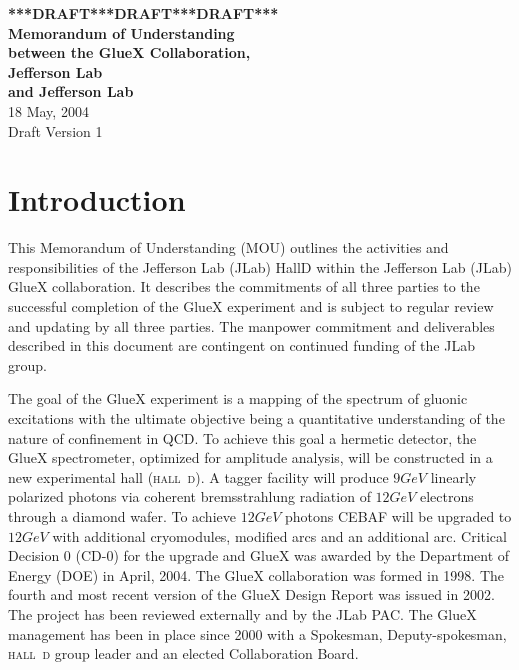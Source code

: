 \documentclass[oneside,12pt,letterpaper]{article}
\newcommand{\hd}{\mbox{\textsc{hall d}}}
\newcommand{\gx}{\mbox{GlueX}}
\newcommand{\instname}{Jefferson Lab}
\newcommand{\groupname}{HallD}
\newcommand{\instabbr}{JLab}
\begin{document}

\begin{center}

\textbf{\large{***DRAFT***DRAFT***DRAFT***\\
Memorandum of Understanding \\ between the 
\gx{} Collaboration, \\ Jefferson Lab \\ and \instname}} \\
18 May, 2004 \\
Draft Version 1
\end{center}

\vspace{1cm}



\section{\label{sec:introduction}Introduction}
This Memorandum of Understanding (MOU) outlines the activities and
responsibilities of the \instname{} (\instabbr ) \groupname{} within
the Jefferson Lab (JLab) \gx{} collaboration.  It describes
the commitments of all three parties to the successful completion
of the \gx{} experiment and is subject to regular review and updating
by all three parties. The manpower commitment and deliverables 
described in this document are contingent on continued funding of 
the \instabbr{} group.


The goal of the \gx{} experiment is a mapping of the spectrum of gluonic
excitations with the ultimate objective being a quantitative understanding of
the nature of confinement in QCD.  To achieve this goal a hermetic detector,
the \gx{} spectrometer, optimized for amplitude analysis, will be constructed
in a new experimental hall (\hd ).  A tagger facility will produce 
$9 GeV$ linearly polarized photons via coherent bremsstrahlung radiation 
of $12 GeV$ electrons through a diamond wafer.  To achieve $12 GeV$ 
photons CEBAF will be upgraded to $12 GeV$ with additional cryomodules, 
modified arcs and an additional arc.  Critical Decision 0 (CD-0) for the 
upgrade and \gx{} was awarded by the Department of Energy (DOE) in April, 
2004.  The \gx{} collaboration was formed in 1998.  The fourth and most 
recent version of the \gx{} Design Report was issued in 2002.  The project 
has been reviewed externally and by the JLab PAC.  The \gx{} management 
has been in place since 2000 with a Spokesman, Deputy-spokesman, \hd{} 
group leader and an elected Collaboration Board.
\end{document}
